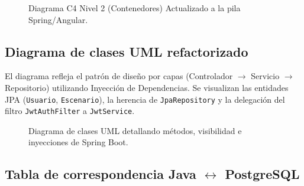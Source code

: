 \documentclass[12pt]{article}
\begin{document}
\begin{figure}[H]
    \centering
    \caption{Diagrama C4 Nivel 2 (Contenedores) Actualizado a la pila Spring/Angular.}
\end{figure}

\subsection{Diagrama de clases UML refactorizado}
El diagrama refleja el patrón de diseño por capas (Controlador $\rightarrow$ Servicio $\rightarrow$ Repositorio) utilizando Inyección de Dependencias. Se visualizan las entidades JPA (\texttt{Usuario}, \texttt{Escenario}), la herencia de \texttt{JpaRepository} y la delegación del filtro \texttt{JwtAuthFilter} a \texttt{JwtService}.

\begin{figure}[H]
    \centering
    \caption{Diagrama de clases UML detallando métodos, visibilidad e inyecciones de Spring Boot.}
\end{figure}

\subsection{Tabla de correspondencia Java $\leftrightarrow$ PostgreSQL}
\begin{table}[H]
\centering
{}
\end{table}
\end{document}
